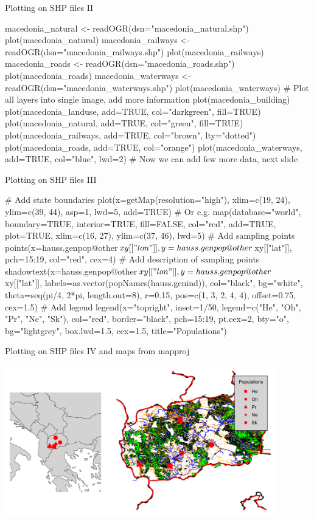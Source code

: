 \documentclass[compress, ucs, xelatex, 11pt, xcolor=svgnames, aspectratio=169,
	hyperref={
		bookmarks=true,
		unicode=true,
		colorlinks=true,
		pdftitle={Molecular data in R},
		plainpages=false,
		pdfauthor={Vojtech Zeisek},
		pdfsubject={Course about phylogeny and evolution in R},
		pdfcreator={XeLaTeX},
		pdfkeywords={R, evolution, phylogeny, molecular data},
		linkcolor=Crimson, %
		anchorcolor=Magenta, %
		citecolor=Magenta, %
		filecolor=Magenta, %
		menucolor=Magenta, %
		urlcolor=DodgerBlue, %
		pdftex},
	url={hyphens, lowtilde} %
	]{beamer}
\begin{document}
\begin{frame}[fragile]{Plotting on SHP files II}
	\begin{spluscode}
    macedonia_natural <- readOGR(dsn="macedonia_natural.shp")
    plot(macedonia_natural)
    macedonia_railways <- readOGR(dsn="macedonia_railways.shp")
    plot(macedonia_railways)
    macedonia_roads <- readOGR(dsn="macedonia_roads.shp")
    plot(macedonia_roads)
    macedonia_waterways <- readOGR(dsn="macedonia_waterways.shp")
    plot(macedonia_waterways)
    # Plot all layers into single image, add more information
    plot(macedonia_building)
    plot(macedonia_landuse, add=TRUE, col="darkgreen", fill=TRUE)
    plot(macedonia_natural, add=TRUE, col="green", fill=TRUE)
    plot(macedonia_railways, add=TRUE, col="brown", lty="dotted")
    plot(macedonia_roads, add=TRUE, col="orange")
    plot(macedonia_waterways, add=TRUE, col="blue", lwd=2)
    # Now we can add few more data, next slide
	\end{spluscode}
\end{frame}

\begin{frame}[fragile]{Plotting on SHP files III}
	\begin{spluscode}
    # Add state boundaries
    plot(x=getMap(resolution="high"), xlim=c(19, 24), ylim=c(39, 44), asp=1,
      lwd=5, add=TRUE) # Or e.g.
    map(database="world", boundary=TRUE, interior=TRUE, fill=FALSE,
      col="red", add=TRUE, plot=TRUE, xlim=c(16, 27), ylim=c(37, 46), lwd=5)
    # Add sampling points
    points(x=hauss.genpop@other$xy[["lon"]],
      y=hauss.genpop@other$xy[["lat"]], pch=15:19, col="red", cex=4)
    # Add description of sampling points
    shadowtext(x=hauss.genpop@other$xy[["lon"]], y=hauss.genpop@other$
      xy[["lat"]], labels=as.vector(popNames(hauss.genind)), col="black",
      bg="white", theta=seq(pi/4, 2*pi, length.out=8), r=0.15,
      pos=c(1, 3, 2, 4, 4), offset=0.75, cex=1.5)
    # Add legend
    legend(x="topright", inset=1/50, legend=c("He", "Oh", "Pr", "Ne", "Sk"),
      col="red", border="black", pch=15:19, pt.cex=2, bty="o",
      bg="lightgrey", box.lwd=1.5, cex=1.5, title="Populations")
	\end{spluscode}
\end{frame}

\begin{frame}{Plotting on SHP files IV and maps from mapproj}
	\begin{center}
		\includegraphics[height=6.5cm]{mapy.png}
	\end{center}
\end{frame}
\end{document}
